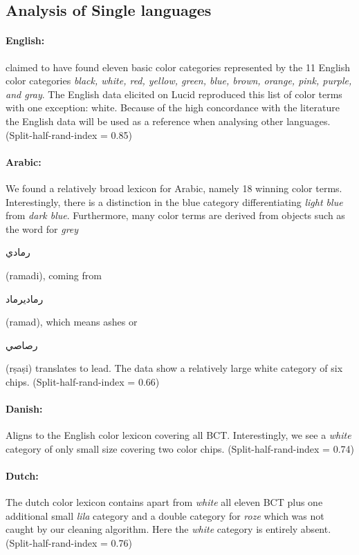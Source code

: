 \subsection{Analysis of Single languages}

\paragraph{English:}
\textcite{berlinBasic1969} claimed to have found eleven basic color categories represented by the 11 English color categories \textit{black, white, red, yellow, green, blue, brown, orange, pink, purple, and gray}.
The English data elicited on Lucid reproduced this list of color terms with one exception: white.
Because of the high concordance with the literature the English data will be used as a reference when analysing other languages.
(Split-half-rand-index = 0.85)

\paragraph{Arabic:}

We found a relatively broad lexicon for Arabic, namely 18 winning color terms. Interestingly, there is a distinction in the blue category differentiating \textit{light blue} from \textit{dark blue}.
Furthermore, many color terms are derived from objects such as the word for \textit{grey}
\begin{Arabic}رمادي\end{Arabic}(ramadi), coming from \begin{Arabic}رماديرماد\end{Arabic}(ramad), which means ashes or \begin{Arabic}رصاصي\end{Arabic}(rṣaṣi) translates to lead.
The data show a relatively large white category of six chips. (Split-half-rand-index = 0.66)


\paragraph{Danish:}
Aligns to the English color lexicon covering all BCT.
Interestingly, we see a \textit{white} category of only small size covering two color chips.
(Split-half-rand-index = 0.74)

\paragraph{Dutch:}
The dutch color lexicon contains apart from \textit{white} all eleven BCT plus one additional small \textit{lila} category and a double category for \textit{roze} which was not caught by our cleaning algorithm.
Here the \textit{white} category is entirely absent. 
(Split-half-rand-index = 0.76)

